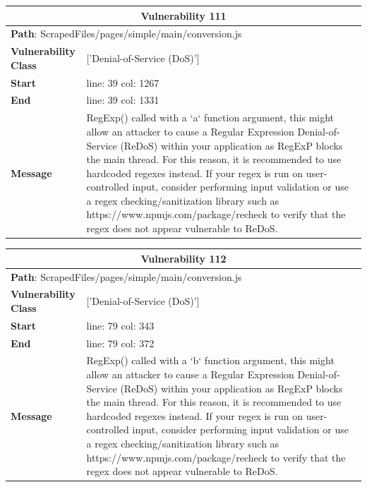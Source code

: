 \documentclass[12pt]{article}
\begin{document}
\vspace{0.7cm}
\FloatBarrier
\begin{table}[!h]
\centering
\renewcommand{\arraystretch}{1.3}
\begin{tabular}{|l|p{10cm}|}
\hline
\multicolumn{2}{|c|}{\textbf{Vulnerability 111}} \\
\hline
\multicolumn{2}{|l|}{\textbf{Path}: ScrapedFiles/pages/simple/main/conversion.js} \\
\hline
\textbf{Vulnerability Class} & ['Denial-of-Service (DoS)'] \\
\hline
\textbf{Start} & line: 39 \quad col: 1267 \\
\hline
\textbf{End} & line: 39 \quad col: 1331 \\
\hline
\textbf{Message} & RegExp() called with a `a` function argument, this might allow an attacker to cause a Regular Expression Denial-of-Service (ReDoS) within your application as RegExP blocks the main thread. For this reason, it is recommended to use hardcoded regexes instead. If your regex is run on user-controlled input, consider performing input validation or use a regex checking/sanitization library such as https://www.npmjs.com/package/recheck to verify that the regex does not appear vulnerable to ReDoS. \\
\hline
\end{tabular}
\end{table}
\vspace{0.7cm}
\FloatBarrier
\begin{table}[!h]
\centering
\renewcommand{\arraystretch}{1.3}
\begin{tabular}{|l|p{10cm}|}
\hline
\multicolumn{2}{|c|}{\textbf{Vulnerability 112}} \\
\hline
\multicolumn{2}{|l|}{\textbf{Path}: ScrapedFiles/pages/simple/main/conversion.js} \\
\hline
\textbf{Vulnerability Class} & ['Denial-of-Service (DoS)'] \\
\hline
\textbf{Start} & line: 79 \quad col: 343 \\
\hline
\textbf{End} & line: 79 \quad col: 372 \\
\hline
\textbf{Message} & RegExp() called with a `b` function argument, this might allow an attacker to cause a Regular Expression Denial-of-Service (ReDoS) within your application as RegExP blocks the main thread. For this reason, it is recommended to use hardcoded regexes instead. If your regex is run on user-controlled input, consider performing input validation or use a regex checking/sanitization library such as https://www.npmjs.com/package/recheck to verify that the regex does not appear vulnerable to ReDoS. \\
\hline
\end{tabular}
\end{table}
\end{document}
